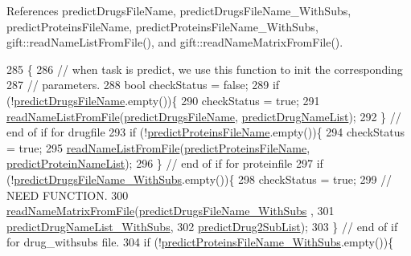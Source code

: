 References predict\+Drugs\+File\+Name, predict\+Drugs\+File\+Name\+\_\+\+With\+Subs, predict\+Proteins\+File\+Name, predict\+Proteins\+File\+Name\+\_\+\+With\+Subs, gift\+::read\+Name\+List\+From\+File(), and gift\+::read\+Name\+Matrix\+From\+File().


\begin{DoxyCode}
285                                                          \{
286     \textcolor{comment}{// when task is predict, we use this function to init the corresponding}
287     \textcolor{comment}{// parameters.}
288     \textcolor{keywordtype}{bool} checkStatus = \textcolor{keyword}{false};
289     \textcolor{keywordflow}{if} (!\hyperlink{classgift_1_1parameters_ac19aca119982c0f318958d6d5744bec0}{predictDrugsFileName}.empty())\{
290       checkStatus = \textcolor{keyword}{true};
291       \hyperlink{namespacegift_afe4c9e96cae6d6ed3f921e117498e5a5}{readNameListFromFile}(\hyperlink{classgift_1_1parameters_ac19aca119982c0f318958d6d5744bec0}{predictDrugsFileName},
      \hyperlink{namespacegift_a9cc6da68eeea28ac6c6a65cd9f248e5b}{predictDrugNameList});
292     \} \textcolor{comment}{// end of if for drugfile}
293     \textcolor{keywordflow}{if} (!\hyperlink{classgift_1_1parameters_aaefcd06c42b5ddd57400b70cae95858d}{predictProteinsFileName}.empty())\{
294       checkStatus = \textcolor{keyword}{true};
295       \hyperlink{namespacegift_afe4c9e96cae6d6ed3f921e117498e5a5}{readNameListFromFile}(\hyperlink{classgift_1_1parameters_aaefcd06c42b5ddd57400b70cae95858d}{predictProteinsFileName},
      \hyperlink{namespacegift_a03bb78fc438e2b1af29ff3b46b70a085}{predictProteinNameList});
296     \} \textcolor{comment}{// end of if for proteinfile}
297     \textcolor{keywordflow}{if} (!\hyperlink{classgift_1_1parameters_ad28f2340e58e3f081edd6541fac12e10}{predictDrugsFileName\_WithSubs}.empty())\{
298       checkStatus  = \textcolor{keyword}{true};
299       \textcolor{comment}{// NEED FUNCTION.}
300       \hyperlink{namespacegift_ab7799569190a9131476f02f9a78539fb}{readNameMatrixFromFile}(\hyperlink{classgift_1_1parameters_ad28f2340e58e3f081edd6541fac12e10}{predictDrugsFileName\_WithSubs}
      ,
301                              \hyperlink{namespacegift_a85bd1982c5b60a7cf09a0f80398bb051}{predictDrugNameList\_WithSubs},
302                              \hyperlink{namespacegift_a00bda5cc17262f36063eed0fbf03459c}{predictDrug2SubList});
303     \} \textcolor{comment}{// end of if for drug\_withsubs file.}
304     \textcolor{keywordflow}{if} (!\hyperlink{classgift_1_1parameters_a2da7792363c911382a3141486b0a618b}{predictProteinsFileName\_WithSubs}.empty())\{

\end{DoxyCode}
